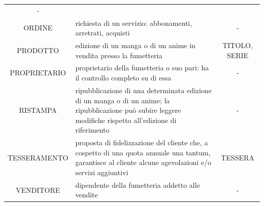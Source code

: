 \documentclass[a4paper]{scrartcl}
\begin{document}
\begin{longtable}{c p{2.8in} c}
	- \\
	ORDINE &
	richiesta di un servizio: abbonamenti, arretrati, acquisti &
	- \\
	PRODOTTO &
	edizione di un manga o di un anime in vendita presso la fumetteria &
	TITOLO, SERIE \\
	PROPRIETARIO &
	proprietario della fumetteria o suo pari: ha il controllo completo su di essa &
	- \\
	RISTAMPA &
	ripubblicazione di una determinata edizione di un manga o di un anime; la ripubblicazione può subire leggere modifiche rispetto all'edizione di riferimento &
	- \\ 
	TESSERAMENTO &
	proposta di fidelizzazione del cliente che, a cospetto di una quota annuale una tantum, garantisce al cliente alcune agevolazioni e/o servizi aggiuntivi &
	TESSERA \\
	VENDITORE &
	dipendente della fumetteria addetto alle vendite &
	- \\
\end{longtable}
\end{document}
